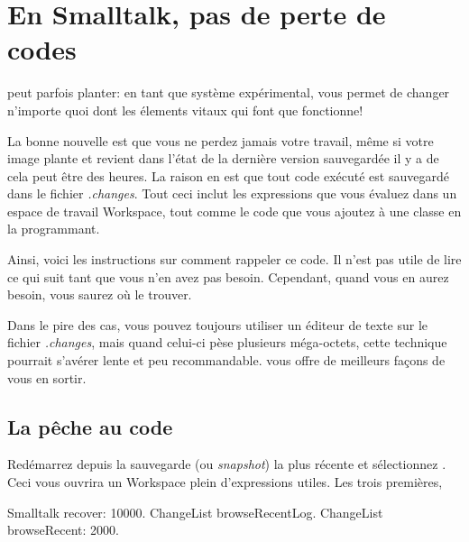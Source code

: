 \documentclass[a4paper,10pt,twoside]{book}
\begin{document}
\section{En Smalltalk, pas de perte de codes}
\label{sec:cantLoseCode} %

\pharo peut parfois planter: en tant que syst\`eme exp\'erimental, \pharo vous permet
de changer n'importe quoi dont les \'elements vitaux qui font que \pharo fonctionne!


La bonne nouvelle est que vous ne perdez jamais votre travail, m\^eme si votre 
image plante et revient dans l'\'etat de la derni\`ere version sauvegard\'ee il y 
a de cela peut \^etre des heures.
La raison en est que tout code ex\'ecut\'e est sauvegard\'e dans le fichier
\emph{.changes}.
Tout ceci inclut les expressions que vous \'evaluez dans un espace de travail Workspace,
tout comme le code que vous ajoutez \`a une classe en la programmant.

Ainsi, voici les instructions sur comment rappeler ce code.
Il n'est pas utile de lire ce qui suit tant que vous n'en avez pas besoin.
Cependant, quand vous en aurez besoin, vous saurez o\`u le trouver.

Dans le pire des cas, vous pouvez toujours utiliser un \'editeur de texte
sur le fichier \emph{.changes}, mais quand celui-ci p\`ese plusieurs m\'ega-octets,
cette technique pourrait s'av\'erer lente et peu recommandable.
\pharo vous offre de meilleurs fa\c{c}ons de vous en sortir.

\subsection{La p\^eche au code}

Red\'emarrez \pharo depuis la sauvegarde (ou \emph{snapshot}) la plus r\'ecente et
s\'electionnez . 
Ceci vous ouvrira un Workspace plein d'expressions utiles. Les trois premi\`eres,

\begin{code}{}
Smalltalk recover: 10000.
ChangeList browseRecentLog.
ChangeList browseRecent: 2000.
\end{code}
\end{document}
